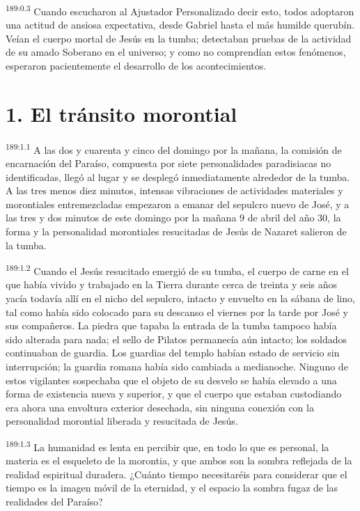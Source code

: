 \par 
\textsuperscript{189:0.3} Cuando escucharon al Ajustador Personalizado decir esto, todos adoptaron una actitud de ansiosa expectativa, desde Gabriel hasta el más humilde querubín. Veían el cuerpo mortal de Jesús en la tumba; detectaban pruebas de la actividad de su amado Soberano en el universo; y como no comprendían estos fenómenos, esperaron pacientemente el desarrollo de los acontecimientos.

\section*{1. El tránsito morontial}
\par 
\textsuperscript{189:1.1} A las dos y cuarenta y cinco del domingo por la mañana, la comisión de encarnación del Paraíso, compuesta por siete personalidades paradisiacas no identificadas, llegó al lugar y se desplegó inmediatamente alrededor de la tumba. A las tres menos diez minutos, intensas vibraciones de actividades materiales y morontiales entremezcladas empezaron a emanar del sepulcro nuevo de José, y a las tres y dos minutos de este domingo por la mañana 9 de abril del año 30, la forma y la personalidad morontiales resucitadas de Jesús de Nazaret salieron de la tumba.

\par 
\textsuperscript{189:1.2} Cuando el Jesús resucitado emergió de su tumba, el cuerpo de carne en el que había vivido y trabajado en la Tierra durante cerca de treinta y seis años yacía todavía allí en el nicho del sepulcro, intacto y envuelto en la sábana de lino, tal como había sido colocado para su descanso el viernes por la tarde por José y sus compañeros. La piedra que tapaba la entrada de la tumba tampoco había sido alterada para nada; el sello de Pilatos permanecía aún intacto; los soldados continuaban de guardia. Los guardias del templo habían estado de servicio sin interrupción; la guardia romana había sido cambiada a medianoche. Ninguno de estos vigilantes sospechaba que el objeto de su desvelo se había elevado a una forma de existencia nueva y superior, y que el cuerpo que estaban custodiando era ahora una envoltura exterior desechada, sin ninguna conexión con la personalidad morontial liberada y resucitada de Jesús.

\par 
\textsuperscript{189:1.3} La humanidad es lenta en percibir que, en todo lo que es personal, la materia es el esqueleto de la morontia, y que ambos son la sombra reflejada de la realidad espiritual duradera. ¿Cuánto tiempo necesitaréis para considerar que el tiempo es la imagen móvil de la eternidad, y el espacio la sombra fugaz de las realidades del Paraíso?


